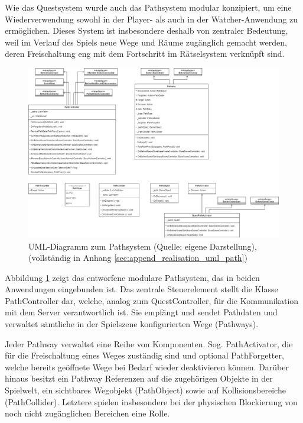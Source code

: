 Wie das Questsystem wurde auch das Pathsystem modular konzipiert, um eine Wiederverwendung sowohl in der Player- als auch in der Watcher-Anwendung zu ermöglichen. Dieses System ist insbesondere deshalb von zentraler Bedeutung, weil im Verlauf des Spiels neue Wege und Räume zugänglich gemacht werden, deren Freischaltung eng mit dem Fortschritt im Rätselsystem verknüpft sind.

\begin{figure}[ht]
\centering
\includegraphics[width=1\linewidth]{content/pictures/PathSystem.drawio.png}
\caption{UML-Diagramm zum Pathsystem (Quelle: eigene Darstellung), (vollständig in Anhang \ref{sec:append_realisation_uml_path})}
\label{fig:path-system-uml}
\end{figure}

Abbildung \ref{fig:path-system-uml} zeigt das entworfene modulare Pathsystem, das in beiden Anwendungen eingebunden ist. Das zentrale Steuerelement stellt die Klasse PathController dar, welche, analog zum QuestController, für die Kommunikation mit dem Server verantwortlich ist. Sie empfängt und sendet Pathdaten und verwaltet sämtliche in der Spielszene konfigurierten Wege (Pathways).

Jeder Pathway verwaltet eine Reihe von Komponenten. Sog. PathActivator, die für die Freischaltung eines Weges zuständig sind und optional PathForgetter, welche bereits geöffnete Wege bei Bedarf wieder deaktivieren können. Darüber hinaus besitzt ein Pathway Referenzen auf die zugehörigen Objekte in der Spielwelt, ein sichtbares Wegobjekt (PathObject) sowie auf Kollisionsbereiche (PathCollider). Letztere spielen insbesondere bei der physischen Blockierung von noch nicht zugänglichen Bereichen eine Rolle.

